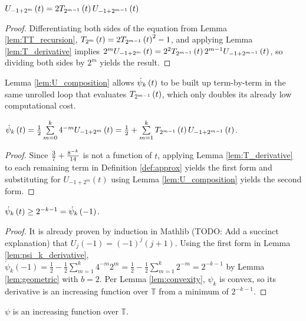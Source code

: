 \begin{lemma}
  \label{lem:U_composition}
  $U_{-1 + 2^m}\left(t\right) = 2 T_{2^{m - 1}}\left(t\right) U_{-1 + 2^{m - 1}}\left(t\right)$
\end{lemma}
\begin{proof}
  Differentiating both sides of the equation from Lemma \ref{lem:TT_recursion}, $T_{2^{m}}\left(t\right) = 2T_{2^{m - 1}}\left(t\right)^2 - 1$, and applying Lemma \ref{lem:T_derivative} implies $2^m U_{-1 + 2^m}\left(t\right) = 2^2T_{2^{m - 1}}\left(t\right) 2^{m - 1} U_{-1 + 2^{m - 1}}\left(t\right)$, so dividing both sides by $2^m$ yields the result.
\end{proof}
Lemma \ref{lem:U_composition} allows $\dot{\psi}_{k}\left(t\right)$ to be built up term-by-term in the same unrolled loop that evaluates $T_{2^{m - 1}}\left(t\right)$, which only doubles its already low computational cost.
\begin{lemma}
  \label{lem:psi_k_derivative}
  $\dot{\psi}_{k}\left(t\right) = \frac{1}{2} \sum\limits_{m = 0}^k 4^{-m} U_{-1 + 2^m}\left(t\right) = \frac{1}{2} + \sum\limits_{m = 1}^k T_{2^{m - 1}}\left(t\right) U_{-1 + 2^{m - 1}}\left(t\right)$.
\end{lemma}
\begin{proof}
  Since $\frac{3}{7} + \frac{8^{-k}}{14}$ is not a function of $t$, applying Lemma \ref{lem:T_derivative} to each remaining term in Definition \ref{def:approx} yields the first form and substituting for $U_{-1 + 2^m}\left(t\right)$ using Lemma \ref{lem:U_composition} yields the second form.
\end{proof}

\begin{lemma}[]
  \label{lem:positive_derivative}
   $\dot{\psi}_{k}\left(t\right) \geq 2^{-k - 1} = \dot{\psi}_k\left(-1\right)$.
\end{lemma}
\begin{proof}
  It is already proven by induction in Mathlib (TODO: Add a succinct explanation) that $U_j\left(-1\right) = \left(-1\right)^j \left(j + 1\right)$. Using the first form in Lemma \ref{lem:psi_k_derivative}, $\dot{\psi}_k\left(-1\right) = \frac{1}{2} - \frac{1}{2} \sum\limits_{m = 1}^k 4^{-m} 2^m = \frac{1}{2} - \frac{1}{2} \sum\limits_{m = 1}^k 2^{-m} = 2^{-k - 1}$ by Lemma \ref{lem:geometric} with $b = 2$. Per Lemma \ref{lem:convexity}, $\psi_k$ is convex, so its derivative is an increasing function over $\mathbb{T}$ from a minimum of $2^{-k - 1}$.
\end{proof}

\begin{lemma}
  \label{lem:increasing}
  $\psi$ is an increasing function over $\mathbb{T}$.
\end{lemma}

